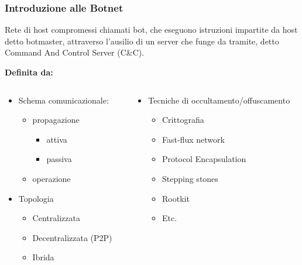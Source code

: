 \begin{frame}
    \titlepage
\end{frame}



\begin{frame}
    \frametitle{Introduzione  alle Botnet}
    \begin{definition}[Botnet]
        Rete di host compromessi chiamati bot, che eseguono istruzioni impartite da host detto botmaster, attraverso l'ausilio di un server che funge da tramite,  detto Command And Control Server (C\&C).
    \end{definition}
    \centering
    \textbf{Definita da:}
    \begin{columns}[t]

        \begin{column}{0.5\textwidth}
            \begin{itemize}
                \item Schema comunicazionale:
                      \begin{itemize}
                          \item propagazione
                                \begin{itemize}
                                    \item attiva
                                    \item passiva
                                \end{itemize}
                          \item operazione
                      \end{itemize}
                \item Topologia
                      \begin{itemize}
                          \item Centralizzata
                          \item Decentralizzata (P2P)
                          \item Ibrida
                      \end{itemize}
            \end{itemize}
        \end{column}
        \begin{column}{0.5\textwidth}
            \begin{itemize}
                \item Tecniche di occultamento/offuscamento
                      \begin{itemize}
                          \item Crittografia
                          \item Fast-flux network
                          \item Protocol Encapsulation
                          \item Stepping stones
                          \item Rootkit
                          \item Etc.
                      \end{itemize}


\end{itemize}
\end{column}
\end{columns}
\end{frame}
